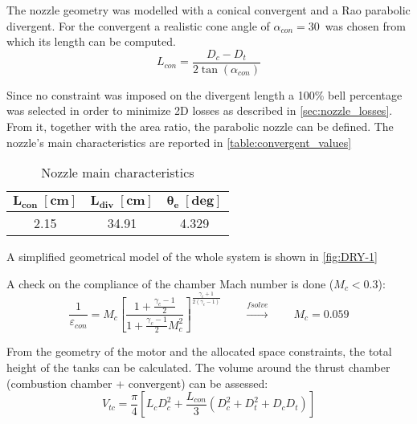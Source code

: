The nozzle geometry was modelled with a conical convergent and a Rao parabolic divergent\cite{rao_article}. For the convergent a realistic cone angle of $\alpha_{con} = 30$\textdegree $\,$ was chosen from which its length can be computed.
\begin{equation}
    L_{con} = \frac{D_c - D_t}{2 \tan(\alpha_{con})}
\end{equation} 

Since no constraint was imposed on the divergent length a 100\% bell percentage was selected in order to minimize 2D losses as described in \autoref{sec:nozzle_losses}. From it, together with the area ratio, the parabolic nozzle can be defined. The nozzle's main characteristics are reported in \autoref{table:convergent_values}
\begin{table}[H]
    \renewcommand{\arraystretch}{1.2}
    \centering
    \begin{tabular}{|c|c|c|}
        \hline
        $\boldsymbol{L_{con} \; [\textbf{cm}]}$ & $\boldsymbol{L_{div} \; [\textbf{cm}]}$ & $\boldsymbol{\theta_e \; [\textbf{deg}]}$ \\
        \hline
        \hline
        2.15 & 34.91 & 4.329 \\
        \hline
    \end{tabular}
    \caption{Nozzle main characteristics}
    \label{table:convergent_values}
\end{table}

A simplified geometrical model of the whole system is shown in \autoref{fig:DRY-1}



A check on the compliance of the chamber Mach number is done ($M_c < 0.3$):
\begin{equation}    
    \frac{1}{\varepsilon_{con}} = M_c \left[ \frac{1 + \frac{\gamma_c - 1}{2}}{1 + \frac{\gamma_c - 1}{2} M_c^2} \right]^{\frac{\gamma_c + 1}{2(\gamma_c - 1)}}
    \qquad \xrightarrow{\textit{fsolve}} \qquad M_c = 0.059
\end{equation}

From the geometry of the motor and the allocated space constraints, the total height of the tanks can be calculated. The volume around the thrust chamber (combustion chamber + convergent) can be assessed:
\begin{equation}
    V_{tc} = \frac{\pi}{4} \left[L_c D_c^2  + \frac{L_{con}}{3} \left(D_c^2 + D_t^2 + D_c D_t\right)\right]
    \label{eq:v_tc}
\end{equation}

